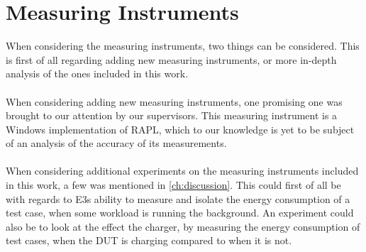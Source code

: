\section{Measuring Instruments}

When considering the measuring instruments, two things can be considered. This is first of all regarding adding new measuring instruments, or more in-depth analysis of the ones included in this work.

\paragraph*{}
When considering adding new measuring instruments, one promising one was brought to our attention by our supervisors. This measuring instrument is a Windows implementation of RAPL, which to our knowledge is yet to be subject of an analysis of the accuracy of its measurements.

\paragraph*{}
When considering additional experiments on the measuring instruments included in this work, a few was mentioned in \cref{ch:discussion}. This could first of all be with regards to E3s ability to measure and isolate the energy consumption of a test case, when some workload is running the background. An experiment could also be to look at the effect the charger, by measuring the energy consumption of test cases, when the DUT is charging compared to when it is not. 